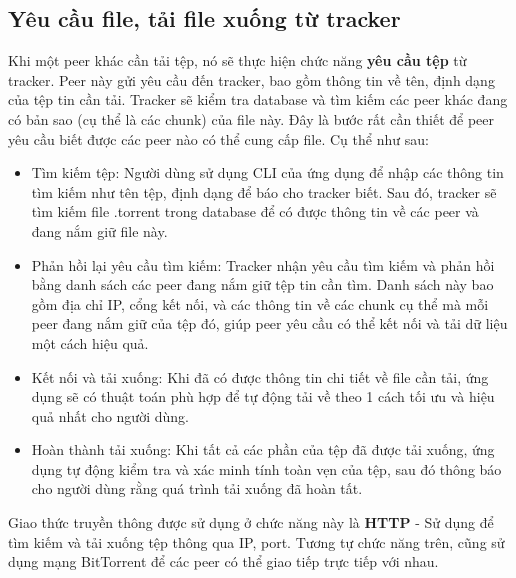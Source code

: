 \subsection{Yêu cầu file, tải file xuống từ tracker}
Khi một peer khác cần tải tệp, nó sẽ thực hiện chức năng \textbf{yêu cầu tệp} từ tracker. Peer này gửi yêu cầu đến tracker, bao gồm thông tin về tên, định dạng của tệp tin cần tải. Tracker sẽ kiểm tra database và tìm kiếm các peer khác đang có bản sao (cụ thể là các chunk) của file này. Đây là bước rất cần thiết để peer yêu cầu biết được các peer nào có thể cung cấp file. Cụ thể như sau:
\begin{itemize}
    \item Tìm kiếm tệp: Người dùng sử dụng CLI của ứng dụng để nhập các thông tin tìm kiếm
    như tên tệp, định dạng để báo cho tracker biết. Sau đó, tracker sẽ tìm kiếm file .torrent trong database để có được thông tin về các peer và đang nắm giữ file này.
    \item Phản hồi lại yêu cầu tìm kiếm: Tracker nhận yêu cầu tìm kiếm và phản hồi bằng danh sách các peer đang nắm giữ tệp tin cần tìm. Danh sách này bao gồm địa chỉ IP, cổng kết nối, và các thông tin về các chunk cụ thể mà mỗi peer đang nắm giữ của tệp đó, giúp peer yêu cầu có thể kết nối và tải dữ liệu một cách hiệu quả.
    \item Kết nối và tải xuống: Khi đã có được thông tin chi tiết về file cần tải, ứng dụng sẽ có thuật toán phù hợp để tự động tải về theo 1 cách tối ưu và hiệu quả nhất cho người dùng.
    \item Hoàn thành tải xuống: Khi tất cả các phần của tệp đã được tải xuống, ứng dụng tự động
    kiểm tra và xác minh tính toàn vẹn của tệp, sau đó thông báo cho người dùng rằng quá
    trình tải xuống đã hoàn tất.
\end{itemize}
Giao thức truyền thông được sử dụng ở chức năng này là \textbf{HTTP} - Sử dụng để tìm kiếm và tải xuống tệp thông qua IP, port. Tương tự chức năng trên, 
cũng sử dụng mạng BitTorrent để các peer có thể giao tiếp trực tiếp với nhau. 

